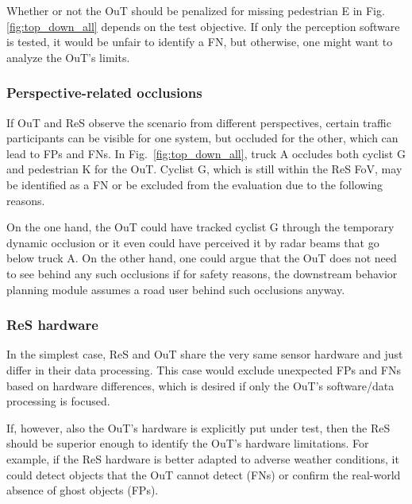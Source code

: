 \documentclass[conference]{IEEEtran}
\begin{document}
Whether or not the OuT should be penalized for missing pedestrian E in Fig. \ref{fig:top_down_all} depends on the test objective. 
If only the perception software is tested, it would be unfair to identify a FN, but otherwise, one might want to analyze the OuT's limits.


\subsubsection{Perspective-related occlusions}
\label{sec:basic_occlusions}

If OuT and ReS observe the scenario from different perspectives, certain traffic participants can be visible for one system, but occluded for the other, which can lead to FPs and FNs. 
In Fig.~\ref{fig:top_down_all}, truck A occludes both cyclist G and pedestrian K for the OuT. 
Cyclist G, which is still within the ReS FoV, may be identified as a FN or be excluded from the evaluation due to the following reasons. 

On the one hand, the OuT could have tracked cyclist G through the temporary dynamic occlusion or it even could have perceived it by radar beams that go below truck A. 
On the other hand, one could argue that the OuT does not need to see behind any such occlusions if for safety reasons, the downstream behavior planning module assumes a road user behind such occlusions anyway.




\subsubsection{ReS hardware}
\label{sec:basic_ref_hw}

In the simplest case, ReS and OuT share the very same sensor hardware and just differ in their data processing. 
This case would exclude unexpected FPs and FNs based on hardware differences, which is desired if only the OuT's software/data processing is focused. 

If, however, also the OuT's hardware is explicitly put under test, then the ReS should be superior enough to identify the OuT's hardware limitations. 
For example, if the ReS hardware is better adapted to adverse weather conditions, it could detect objects that the OuT cannot detect (FNs) or confirm the real-world absence of ghost objects (FPs). 
\end{document}
